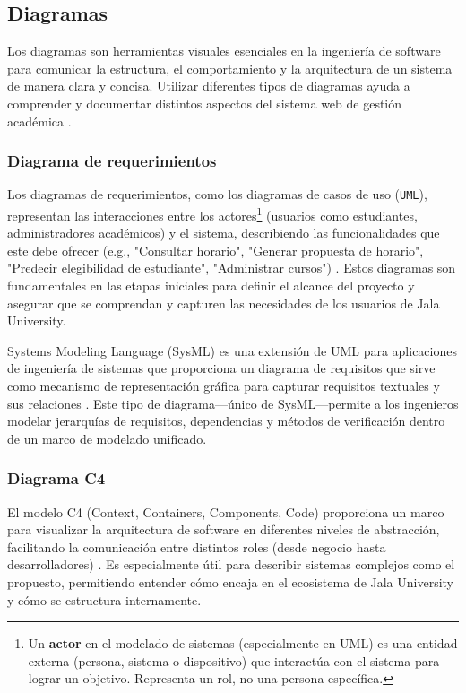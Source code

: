 \subsection{Diagramas}
Los diagramas son herramientas visuales esenciales en la ingeniería de software para comunicar la estructura, el comportamiento y la arquitectura de un sistema de manera clara y concisa.
Utilizar diferentes tipos de diagramas ayuda a comprender y documentar distintos aspectos del sistema web de gestión académica \parencite{Fowler2003}.

\subsubsection{Diagrama de requerimientos}
Los diagramas de requerimientos, como los diagramas de casos de uso (\texttt{UML}), representan las interacciones entre los actores\footnote{Un \textbf{actor} en el modelado de sistemas (especialmente en UML) es una entidad externa (persona, sistema o dispositivo) que interactúa con el sistema para lograr un objetivo.
Representa un rol, no una persona específica.} (usuarios como estudiantes, administradores académicos) y el sistema, describiendo las funcionalidades que este debe ofrecer (e.g., "Consultar horario", "Generar propuesta de horario", "Predecir elegibilidad de estudiante", "Administrar cursos") \parencite{Jacobson1992}.
Estos diagramas son fundamentales en las etapas iniciales para definir el alcance del proyecto y asegurar que se comprendan y capturen las necesidades de los usuarios de Jala University.

Systems Modeling Language (SysML) es una extensión de UML para aplicaciones de ingeniería de sistemas que proporciona un diagrama de requisitos que sirve como mecanismo de representación gráfica para capturar requisitos textuales y sus relaciones \parencite{Friedenthal2014}.
Este tipo de diagrama—único de SysML—permite a los ingenieros modelar jerarquías de requisitos, dependencias y métodos de verificación dentro de un marco de modelado unificado.

\subsubsection{Diagrama C4}
El modelo C4 (Context, Containers, Components, Code) proporciona un marco para visualizar la arquitectura de software en diferentes niveles de abstracción, facilitando la comunicación entre distintos roles (desde negocio hasta desarrolladores) \parencite{BrownC4}.
Es especialmente útil para describir sistemas complejos como el propuesto, permitiendo entender cómo encaja en el ecosistema de Jala University y cómo se estructura internamente.

